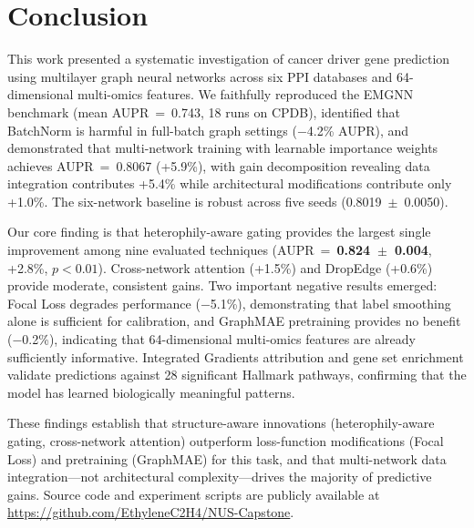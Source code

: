 
\section{Conclusion}

This work presented a systematic investigation of cancer driver gene prediction
using multilayer graph neural networks across six PPI databases and 64-dimensional
multi-omics features. We faithfully reproduced the EMGNN benchmark (mean
AUPR~=~0.743, 18 runs on CPDB), identified that BatchNorm is harmful in full-batch
graph settings ($-$4.2\% AUPR), and demonstrated that multi-network training with
learnable importance weights achieves AUPR~=~0.8067 (+5.9\%), with gain
decomposition revealing data integration contributes +5.4\% while architectural
modifications contribute only +1.0\%. The six-network baseline is robust across
five seeds (0.8019~$\pm$~0.0050).

Our core finding is that heterophily-aware gating provides the largest single
improvement among nine evaluated techniques (AUPR~=~\textbf{0.824~$\pm$~0.004},
+2.8\%, $p<0.01$). Cross-network attention (+1.5\%) and DropEdge (+0.6\%) provide
moderate, consistent gains. Two important negative results emerged: Focal Loss
degrades performance ($-$5.1\%), demonstrating that label smoothing alone is
sufficient for calibration, and GraphMAE pretraining provides no benefit
($-$0.2\%), indicating that 64-dimensional multi-omics features are already
sufficiently informative. Integrated Gradients attribution and gene set enrichment
validate predictions against 28 significant Hallmark pathways, confirming that the
model has learned biologically meaningful patterns.

These findings establish that structure-aware innovations (heterophily-aware
gating, cross-network attention) outperform loss-function modifications (Focal
Loss) and pretraining (GraphMAE) for this task, and that multi-network data
integration---not architectural complexity---drives the majority of predictive
gains. Source code and experiment scripts are publicly available at
\url{https://github.com/EthyleneC2H4/NUS-Capstone}.
